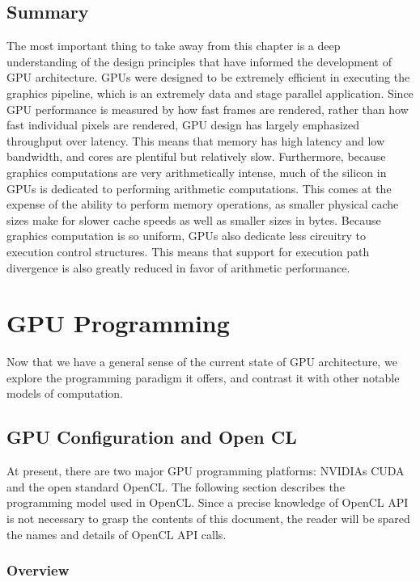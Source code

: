 \documentclass[12pt,twoside]{reedthesis}
\begin{document}
\section{Summary}

The most important thing to take away from this chapter is a deep understanding of the design principles that have informed the development of GPU architecture. GPUs were designed to be extremely efficient in executing the graphics pipeline, which is an extremely data and stage parallel application. Since GPU performance is measured by how fast frames are rendered, rather than how fast individual pixels are rendered, GPU design has largely emphasized throughput over latency. This means that memory has high latency and low bandwidth, and cores are plentiful but relatively slow. Furthermore, because graphics computations are very arithmetically intense, much of the silicon in GPUs is dedicated to performing arithmetic computations. This comes at the expense of the ability to perform memory operations, as smaller physical cache sizes make for slower cache speeds as well as smaller sizes in bytes. Because graphics computation is so uniform, GPUs also dedicate less circuitry to execution control structures. This means that support for execution path divergence is also greatly reduced in favor of arithmetic performance.

\chapter{GPU Programming}

Now that we have a general sense of the current state of GPU architecture, we explore the programming paradigm it offers, and contrast it with other notable models of computation.

\section{GPU Configuration and Open CL}

At present, there are two major GPU programming platforms: NVIDIAs CUDA and the open standard OpenCL. The following section describes the programming model used in OpenCL. Since a precise knowledge of OpenCL API is not necessary to grasp the contents of this document, the reader will be spared the names and details of OpenCL API calls.

\subsection{Overview}
\end{document}

